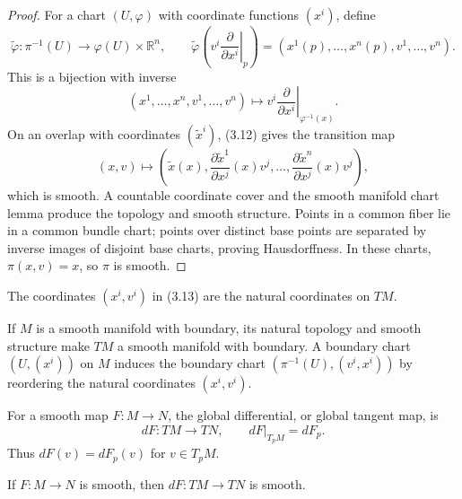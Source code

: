 \begin{proof}
\sketch
For a chart $(U,\varphi)$ with coordinate functions $(x^i)$, define
\[
\widetilde\varphi:\pi^{-1}(U)\to\varphi(U)\times\mathbb{R}^n,
\qquad
\widetilde\varphi
\left(\left.v^i\frac{\partial}{\partial x^i}\right|_p\right)
=(x^1(p),\ldots,x^n(p),v^1,\ldots,v^n). \tag{3.13}
\]
This is a bijection with inverse
\[
(x^1,\ldots,x^n,v^1,\ldots,v^n)
\longmapsto
\left.v^i\frac{\partial}{\partial x^i}\right|_{\varphi^{-1}(x)}.
\]
On an overlap with coordinates $(\widetilde x^i)$, (3.12) gives the transition
map
\[
(x,v)\longmapsto
\left(\widetilde x(x),
\frac{\partial\widetilde x^1}{\partial x^j}(x)v^j,\ldots,
\frac{\partial\widetilde x^n}{\partial x^j}(x)v^j\right),
\]
which is smooth. A countable coordinate cover and the smooth manifold chart
lemma produce the topology and smooth structure. Points in a common fiber lie
in a common bundle chart; points over distinct base points are separated by
inverse images of disjoint base charts, proving Hausdorffness. In these charts,
$\pi(x,v)=x$, so $\pi$ is smooth.
\end{proof}

\begin{notation}
\label{not:3-16-extra-2}
\mathlibok
The coordinates $(x^i,v^i)$ in (3.13) are the natural coordinates on $TM$.
\end{notation}

\begin{proposition}
\label{exer:3-19}
\leanok
{}
If $M$ is a smooth manifold with boundary, its natural topology and smooth
structure make $TM$ a smooth manifold with boundary. A boundary chart
$(U,(x^i))$ on $M$ induces the boundary chart
$(\pi^{-1}(U),(v^i,x^i))$ by reordering the natural coordinates
$(x^i,v^i)$.
\end{proposition}

\begin{definition}
\label{def:3-16-extra-3}
\mathlibok
For a smooth map $F:M\to N$, the global differential, or global tangent map,
is
\[
dF:TM\to TN,
\qquad dF|_{T_pM}=dF_p.
\]
Thus $dF(v)=dF_p(v)$ for $v\in T_pM$.
\end{definition}

\begin{proposition}
\label{prop:3-21}
\mathlibok
{}
If $F:M\to N$ is smooth, then $dF:TM\to TN$ is smooth.
\end{proposition}

